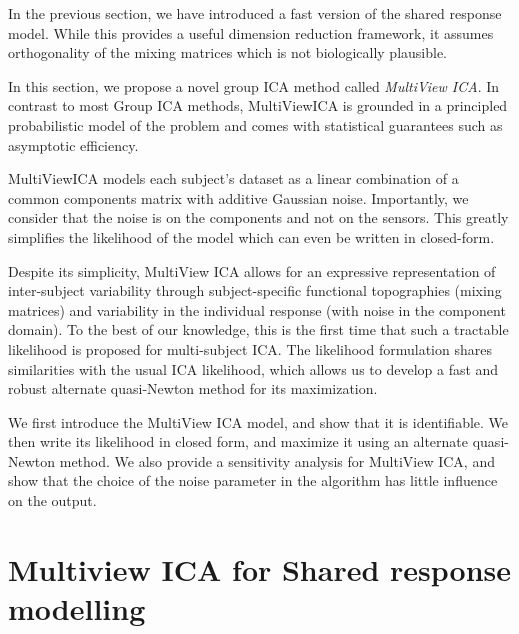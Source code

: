 In the previous section, we have introduced a fast version of the shared
response model. While this provides a useful dimension reduction framework, it
assumes orthogonality of the mixing matrices which is not biologically
plausible.

In this section, we propose a novel group ICA method called \emph{MultiView ICA}.
In contrast to most Group ICA methods, MultiViewICA is grounded in a principled
probabilistic model of the problem and comes with statistical guarantees such as
asymptotic efficiency.

MultiViewICA models each subject's dataset as a linear combination of a common
components matrix with additive Gaussian noise.
% 
Importantly, we consider that the noise is on the components and not on
the sensors.
% 
This greatly simplifies the likelihood of the model which can even be
written in closed-form.

Despite its simplicity, MultiView ICA allows for an expressive representation of inter-subject variability through subject-specific functional topographies (mixing matrices) and variability in the individual response (with noise in the component domain).
% 
To the best of our knowledge, this is the first time that such a tractable likelihood is proposed for multi-subject ICA.
% 
The likelihood formulation shares similarities with the usual ICA likelihood, which allows us to develop a fast and robust alternate quasi-Newton method for its maximization.

We first introduce the MultiView ICA model, and show that it is identifiable. We then write its likelihood in closed form, and maximize it using an alternate quasi-Newton method.
%
We also provide a sensitivity analysis for MultiView ICA, and show that the choice of the noise parameter in the algorithm has little influence on the output.
\section{Multiview ICA for Shared response modelling}
\label{sec:mvica}
